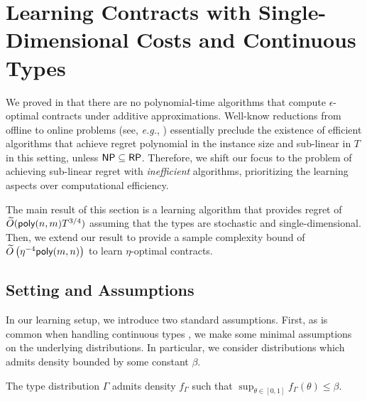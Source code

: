 \section{Learning Contracts with Single-Dimensional Costs and Continuous Types}\label{sec:learning}


We proved in  that there are no polynomial-time algorithms that compute $\epsilon$-optimal contracts under additive approximations. Well-know reductions from offline to online problems (see, \emph{e.g.}, \citet{roughgarden2019minimizing}) essentially preclude the existence of efficient algorithms that achieve regret polynomial in the instance size and sub-linear in $T$ in this setting, unless $\textsf{NP}\subseteq\textsf{RP}$. 
%
Therefore, we shift our focus to the problem of achieving sub-linear regret with \emph{inefficient} algorithms, prioritizing the learning aspects over computational efficiency.


The main result of this section is a learning algorithm that provides regret of $\widetilde O(\textsf{poly}(n,m)T^{3/4})$ assuming that the types are stochastic and single-dimensional.
Then, we extend our result to provide a sample complexity bound of $\widetilde O\left(\eta^{-4}\textsf{poly}(m,n)\right)$ to learn $\eta$-optimal contracts.

\subsection{Setting and Assumptions}

In our learning setup, we introduce two standard assumptions.
First, as is common when handling continuous types \citep{alon2023bayesian, alon2021contracts}, we make some minimal assumptions on the underlying distributions. In particular, we consider distributions which admits density bounded by some constant $\beta$.

\begin{assumption}\label{ass:boundedDensity}
    The type distribution $\Gamma$ admits density $f_\Gamma$ such that  $\sup_{\theta\in[0,1]}f_\Gamma(\theta)\le \beta$.
\end{assumption}


